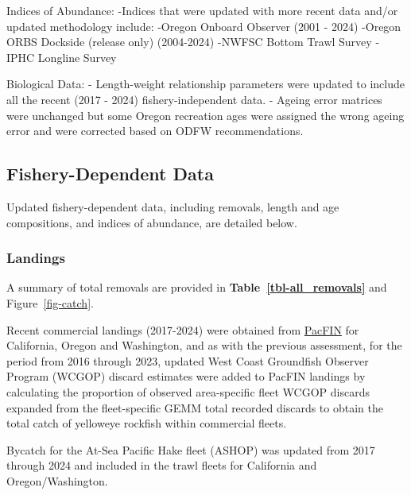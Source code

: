 \documentclass[
]{scrartcl}
\begin{document}
Indices of Abundance: -Indices that were updated with more recent data
and/or updated methodology include: -Oregon Onboard Observer (2001 -
2024) -Oregon ORBS Dockside (release only) (2004-2024) -NWFSC Bottom
Trawl Survey -IPHC Longline Survey

Biological Data: - Length-weight relationship parameters were updated to
include all the recent (2017 - 2024) fishery-independent data. - Ageing
error matrices were unchanged but some Oregon recreation ages were
assigned the wrong ageing error and were corrected based on ODFW
recommendations.

\subsection{Fishery-Dependent Data}\label{fishery-dependent-data}

Updated fishery-dependent data, including removals, length and age
compositions, and indices of abundance, are detailed below.

\subsubsection{Landings}\label{landings}

A summary of total removals are provided in
\textbf{Table~\ref{tbl-all_removals}} and Figure~\ref{fig-catch}.

Recent commercial landings (2017-2024) were obtained from
\href{www.pacfin.psmfc.org}{PacFIN} for California, Oregon and
Washington, and as with the previous assessment, for the period from
2016 through 2023, updated West Coast Groundfish Observer Program
(WCGOP) discard estimates were added to PacFIN landings by calculating
the proportion of observed area-specific fleet WCGOP discards expanded
from the fleet-specific GEMM total recorded discards to obtain the total
catch of yelloweye rockfish within commercial fleets.

Bycatch for the At-Sea Pacific Hake fleet (ASHOP) was updated from 2017
through 2024 and included in the trawl fleets for California and
Oregon/Washington.
\end{document}
